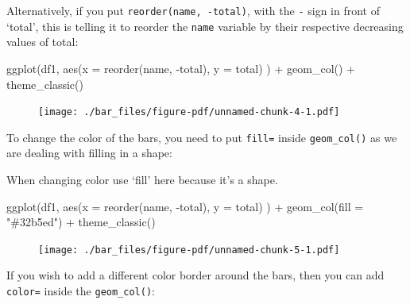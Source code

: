 \documentclass[
  letterpaper,
  DIV=11,
  numbers=noendperiod]{scrreprt}
\newenvironment{Shaded}{\begin{snugshade}}{\end{snugshade}}
\newcommand{\AttributeTok}[1]{\textcolor[rgb]{0.40,0.45,0.13}{#1}}
\newcommand{\FunctionTok}[1]{\textcolor[rgb]{0.28,0.35,0.67}{#1}}
\newcommand{\NormalTok}[1]{\textcolor[rgb]{0.00,0.23,0.31}{#1}}
\newcommand{\SpecialCharTok}[1]{\textcolor[rgb]{0.37,0.37,0.37}{#1}}
\newcommand{\StringTok}[1]{\textcolor[rgb]{0.13,0.47,0.30}{#1}}
\begin{document}
Alternatively, if you put \texttt{reorder(name,\ -total)}, with the
\texttt{-} sign in front of `total', this is telling it to reorder the
\texttt{name} variable by their respective decreasing values of total:

\begin{Shaded}
\begin{Highlighting}[]
\FunctionTok{ggplot}\NormalTok{(df1, }\FunctionTok{aes}\NormalTok{(}\AttributeTok{x =} \FunctionTok{reorder}\NormalTok{(name, }\SpecialCharTok{{-}}\NormalTok{total), }\AttributeTok{y =}\NormalTok{ total) ) }\SpecialCharTok{+} 
  \FunctionTok{geom\_col}\NormalTok{() }\SpecialCharTok{+}
  \FunctionTok{theme\_classic}\NormalTok{()}
\end{Highlighting}
\end{Shaded}

\begin{figure}[H]

{\centering \texttt{[image: ./bar\_files/figure-pdf/unnamed-chunk-4-1.pdf]}

}

\end{figure}

To change the color of the bars, you need to put \texttt{fill=} inside
\texttt{geom\_col()} as we are dealing with filling in a shape:

When changing color use `fill' here because it's a shape.

\begin{Shaded}
\begin{Highlighting}[]
\FunctionTok{ggplot}\NormalTok{(df1, }\FunctionTok{aes}\NormalTok{(}\AttributeTok{x =} \FunctionTok{reorder}\NormalTok{(name, }\SpecialCharTok{{-}}\NormalTok{total), }\AttributeTok{y =}\NormalTok{ total) ) }\SpecialCharTok{+} 
  \FunctionTok{geom\_col}\NormalTok{(}\AttributeTok{fill =} \StringTok{"\#32b5ed"}\NormalTok{) }\SpecialCharTok{+}
  \FunctionTok{theme\_classic}\NormalTok{()}
\end{Highlighting}
\end{Shaded}

\begin{figure}[H]

{\centering \texttt{[image: ./bar\_files/figure-pdf/unnamed-chunk-5-1.pdf]}

}

\end{figure}

If you wish to add a different color border around the bars, then you
can add \texttt{color=} inside the \texttt{geom\_col()}:
\end{document}
